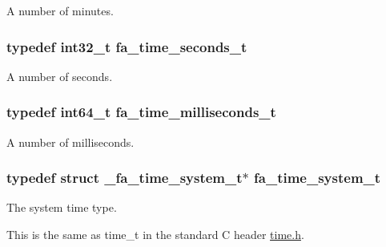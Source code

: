 A number of minutes. 

\hypertarget{group___fa_time_gaa8f8fedfa6f26ed6ad00d134c2aeb6b8}{
\subsubsection[{fa\-\_\-time\-\_\-seconds\-\_\-t}]{\setlength{\rightskip}{0pt plus 5cm}typedef int32\-\_\-t {\bf fa\-\_\-time\-\_\-seconds\-\_\-t}}}\label{group___fa_time_gaa8f8fedfa6f26ed6ad00d134c2aeb6b8}


A number of seconds. 

\hypertarget{group___fa_time_gadebdebeab6c5ba7cd8002d0773635e61}{
\subsubsection[{fa\-\_\-time\-\_\-milliseconds\-\_\-t}]{\setlength{\rightskip}{0pt plus 5cm}typedef int64\-\_\-t {\bf fa\-\_\-time\-\_\-milliseconds\-\_\-t}}}\label{group___fa_time_gadebdebeab6c5ba7cd8002d0773635e61}


A number of milliseconds. 

\hypertarget{group___fa_time_ga7dd7e28574eec80380aac22be7087d2e}{
\subsubsection[{fa\-\_\-time\-\_\-system\-\_\-t}]{\setlength{\rightskip}{0pt plus 5cm}typedef struct \-\_\-fa\-\_\-time\-\_\-system\-\_\-t$\ast$ {\bf fa\-\_\-time\-\_\-system\-\_\-t}}}\label{group___fa_time_ga7dd7e28574eec80380aac22be7087d2e}


The system time type. 

This is the same as {\ttfamily time\-\_\-t} in the standard C header {\ttfamily \hyperlink{time_8h}{time.\-h}}. 

